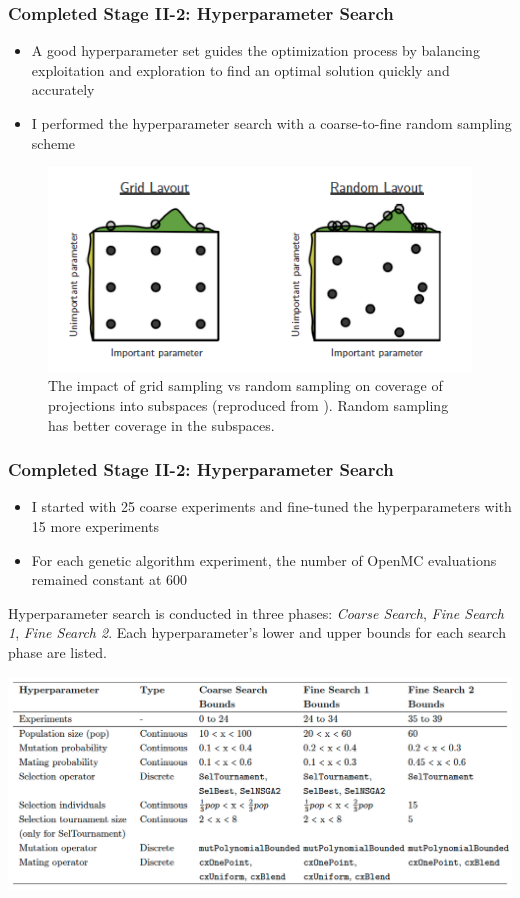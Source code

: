 \begin{frame}
    \frametitle{Completed Stage II-2: Hyperparameter Search}
    \begin{itemize}
        \item A good hyperparameter set guides the optimization process by 
        balancing exploitation and exploration to find an optimal solution quickly 
        and accurately
        \item I performed the hyperparameter search with a coarse-to-fine random 
        sampling scheme
    \end{itemize}
    \begin{figure}[]
        \centering
        \includegraphics[width=0.5\linewidth]{../docs/figures/random_vs_grid_sampling.png} 
        \caption{The impact of grid sampling vs random sampling on coverage of projections 
        into subspaces (reproduced from \cite{jordan_hyperparameter_2017}). 
        Random sampling has better coverage in the subspaces.}
    \end{figure}
\end{frame}

\begin{frame}
    \frametitle{Completed Stage II-2: Hyperparameter Search}
    \begin{itemize}
        \item I started with 25 coarse experiments and fine-tuned the hyperparameters
        with 15 more experiments
        \item For each genetic algorithm experiment, the number 
        of OpenMC evaluations remained constant at 600
    \end{itemize}
    \begin{table}
        \caption{Hyperparameter search is conducted in three phases: \textit{Coarse Search}, 
    \textit{Fine Search 1}, \textit{Fine Search 2}. Each hyperparameter's lower and
    upper bounds for each search phase are listed.}
        \includegraphics[width=0.8\linewidth]{figures/hyperparameter-search.png} 
    \end{table}
\end{frame}

